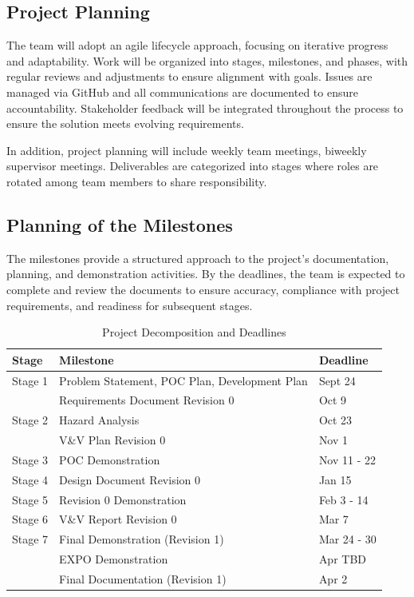 \documentclass[12pt]{article}
\begin{document}
\subsection{Project Planning}

The team will adopt an agile lifecycle approach, focusing on iterative progress
and adaptability. Work will be organized into stages, milestones, and phases,
with regular reviews and adjustments to ensure alignment with goals. Issues are
managed via GitHub and all communications are documented to ensure
accountability. Stakeholder feedback will be integrated throughout the process
to ensure the solution meets evolving requirements.

In addition, project planning will include weekly team meetings, biweekly
supervisor meetings. Deliverables are categorized into stages where roles are
rotated among team members to share responsibility.

\subsection{Planning of the Milestones}

The milestones provide a structured approach to the project's documentation,
planning, and demonstration activities. By the deadlines, the team is expected
to complete and review the documents to ensure accuracy, compliance with project
requirements, and readiness for subsequent stages.

\newpage
\begin{table}[htbp]
  \centering
  \begin{tabular}{|l|l|l|}
  \hline
  \textbf{Stage} & \textbf{Milestone} & \textbf{Deadline} \\
  \hline
  Stage 1 & Problem Statement, POC Plan, Development Plan & Sept 24 \\
  \texttt{} & Requirements Document Revision 0 & Oct 9 \\
  \hline
  Stage 2 & Hazard Analysis & Oct 23 \\
  \texttt{} & V\&V Plan Revision 0 & Nov 1 \\
  \hline
  Stage 3 & POC Demonstration & Nov 11 - 22 \\
  \hline
  Stage 4 & Design Document Revision 0 & Jan 15 \\
  \hline
  Stage 5 & Revision 0 Demonstration & Feb 3 - 14\\
  \hline
  Stage 6 & V\&V Report Revision 0 & Mar 7 \\
  \hline
  Stage 7 & Final Demonstration (Revision 1) & Mar 24 - 30\\
  \texttt{} & EXPO Demonstration & Apr TBD \\
  \texttt{} & Final Documentation (Revision 1) & Apr 2 \\
  \hline
  \end{tabular}
  \caption{Project Decomposition and Deadlines}
  \label{table:2}
\end{table}
\end{document}

